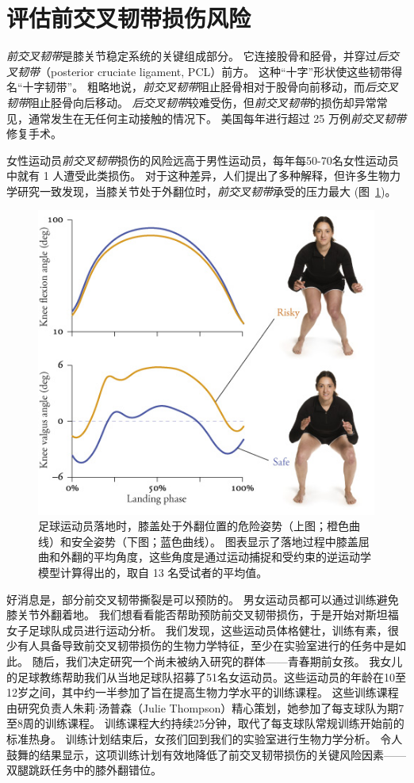 \section{评估前交叉韧带损伤风险}

\textit{前交叉韧带}是膝关节稳定系统的关键组成部分。
它连接股骨和胫骨，并穿过\textit{后交叉韧带}（posterior cruciate ligament, PCL）前方。
这种“十字”形状使这些韧带得名“十字韧带”。
粗略地说，\textit{前交叉韧带}阻止胫骨相对于股骨向前移动，而\textit{后交叉韧带}阻止胫骨向后移动。
\textit{后交叉韧带}较难受伤，但\textit{前交叉韧带}的损伤却异常常见，通常发生在无任何主动接触的情况下。
美国每年进行超过 25 万例\textit{前交叉韧带}修复手术。


女性运动员\textit{前交叉韧带}损伤的风险远高于男性运动员，每年每50-70名女性运动员中就有 1 人遭受此类损伤\cite{bates2016motion}。
对于这种差异，人们提出了多种解释，但许多生物力学研究一致发现，当膝关节处于外翻位时，\textit{前交叉韧带}承受的压力最大 (图~\ref{fig:7_17})。


\begin{figure}[!htb]
	\centering
	\includegraphics[width=0.8\linewidth]{chap7/7_17}
	\caption{足球运动员落地时，膝盖处于外翻位置的危险姿势（上图；橙色曲线）和安全姿势（下图；蓝色曲线）。
		图表显示了落地过程中膝盖屈曲和外翻的平均角度，这些角度是通过运动捕捉和受约束的逆运动学模型计算得出的，取自 13 名受试者的平均值\cite{thompson2017biomechanical}。 \label{fig:7_17}}
\end{figure}


好消息是，部分前交叉韧带撕裂是可以预防的。
男女运动员都可以通过训练避免膝关节外翻着地。
我们想看看能否帮助预防前交叉韧带损伤，于是开始对斯坦福女子足球队成员进行运动分析。
我们发现，这些运动员体格健壮，训练有素，很少有人具备导致前交叉韧带损伤的生物力学特征，至少在实验室进行的任务中是如此。
随后，我们决定研究一个尚未被纳入研究的群体——青春期前女孩。
我女儿的足球教练帮助我们从当地足球队招募了51名女运动员。这些运动员的年龄在10至12岁之间，其中约一半参加了旨在提高生物力学水平的训练课程。
这些训练课程由研究负责人朱莉$\cdot$汤普森（Julie Thompson）精心策划，她参加了每支球队为期7至8周的训练课程。
训练课程大约持续25分钟，取代了每支球队常规训练开始前的标准热身。
训练计划结束后，女孩们回到我们的实验室进行生物力学分析。
令人鼓舞的结果显示，这项训练计划有效地降低了前交叉韧带损伤的关键风险因素——双腿跳跃任务中的膝外翻错位。


